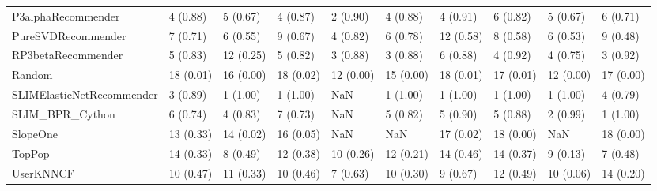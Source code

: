 \begin{tabular}{llllllllll}
                 P3alphaRecommender &                 4 (0.88) &    5 (0.67) &      4 (0.87) &     2 (0.90) &             4 (0.88) &            4 (0.91) &          6 (0.82) &           5 (0.67) &          6 (0.71) \\
                 PureSVDRecommender &                 7 (0.71) &    6 (0.55) &      9 (0.67) &     4 (0.82) &             6 (0.78) &           12 (0.58) &          8 (0.58) &           6 (0.53) &          9 (0.48) \\
                 RP3betaRecommender &                 5 (0.83) &   12 (0.25) &      5 (0.82) &     3 (0.88) &             3 (0.88) &            6 (0.88) &          4 (0.92) &           4 (0.75) &          3 (0.92) \\
                             Random &                18 (0.01) &   16 (0.00) &     18 (0.02) &    12 (0.00) &            15 (0.00) &           18 (0.01) &         17 (0.01) &          12 (0.00) &         17 (0.00) \\
          SLIMElasticNetRecommender &                 3 (0.89) &    1 (1.00) &      1 (1.00) &          NaN &             1 (1.00) &            1 (1.00) &          1 (1.00) &           1 (1.00) &          4 (0.79) \\
                    SLIM\_BPR\_Cython &                 6 (0.74) &    4 (0.83) &      7 (0.73) &          NaN &             5 (0.82) &            5 (0.90) &          5 (0.88) &           2 (0.99) &          1 (1.00) \\
                           SlopeOne &                13 (0.33) &   14 (0.02) &     16 (0.05) &          NaN &                  NaN &           17 (0.02) &         18 (0.00) &                NaN &         18 (0.00) \\
                             TopPop &                14 (0.33) &    8 (0.49) &     12 (0.38) &    10 (0.26) &            12 (0.21) &           14 (0.46) &         14 (0.37) &           9 (0.13) &          7 (0.48) \\
                          UserKNNCF &                10 (0.47) &   11 (0.33) &     10 (0.46) &     7 (0.63) &            10 (0.30) &            9 (0.67) &         12 (0.49) &          10 (0.06) &         14 (0.20) \\
\bottomrule
\end{tabular}
